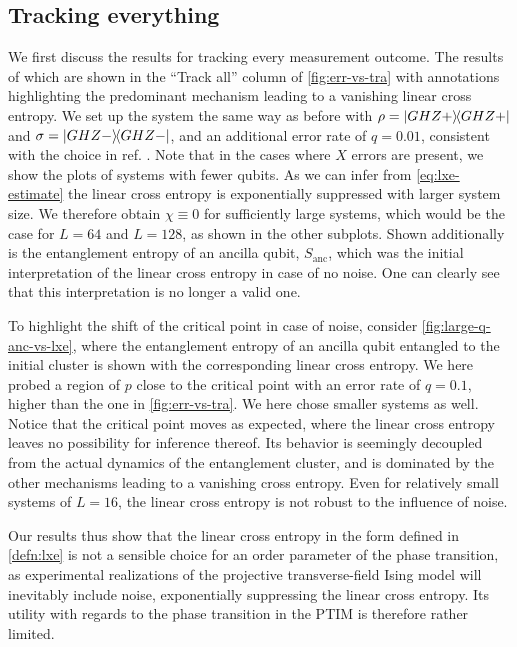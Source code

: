 \subsection{Tracking everything}

We first discuss the results for tracking every measurement outcome. The
results of which are shown in the \enquote{Track all} column of
\cref{fig:err-vs-tra} with annotations highlighting the predominant mechanism
leading to a vanishing linear cross entropy. We set up the system the same way
as before with $\rho = \dyad{GHZ+}$ and $\sigma = \dyad{GHZ-}$, and an
additional error rate of $q=0.01$, consistent with the choice in ref.
\cite{tikhanovskayaUniversalityCrossEntropy2023}.
Note that in the cases where $X$
errors are present, we show the plots of systems with fewer qubits. As we can infer from
\cref{eq:lxe-estimate} the linear cross entropy is exponentially suppressed
with larger system size. We therefore obtain $\chi \equiv 0$ for sufficiently
large systems, which would be the case for $L=64$ and $L=128$, as shown in the
other subplots. Shown additionally is the entanglement entropy of an ancilla
qubit, $S_\mathrm{anc}$, which was the initial interpretation of the linear
cross entropy in case of no noise. One can clearly see that this interpretation
is no longer a valid one. 

To highlight the shift of the critical point in case
of noise, consider \cref{fig:large-q-anc-vs-lxe}, where the entanglement
entropy of an ancilla qubit entangled to the initial cluster is shown with 
the corresponding linear cross entropy. We here probed a region of $p$ close to
the critical point with an error rate of $q=0.1$, higher than the one in
\cref{fig:err-vs-tra}. We here chose smaller systems as well. Notice that the
critical point moves as expected, where the linear cross entropy leaves no
possibility for inference thereof. Its behavior is seemingly decoupled from the
actual dynamics of the entanglement cluster, and is dominated by the other
mechanisms leading to a vanishing cross entropy. Even for relatively small
systems of $L=16$, the linear cross entropy is not robust to the influence of
noise.

Our results thus show that the linear cross entropy in the form defined in
\cref{defn:lxe} is not a sensible choice for an order parameter of the phase
transition, as experimental realizations of the projective transverse-field
Ising model will inevitably include noise, exponentially suppressing the linear
cross entropy. Its utility with regards to the phase transition in the PTIM is
therefore rather limited.

